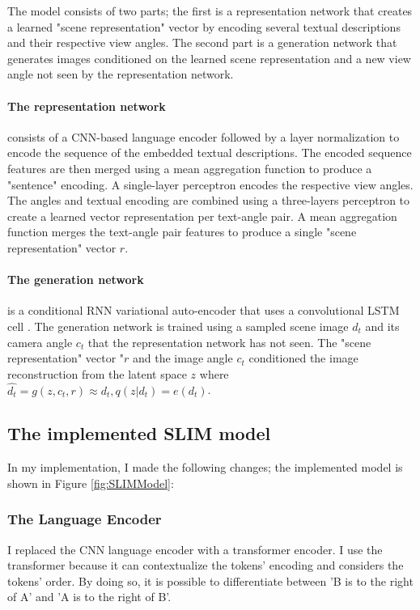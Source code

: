 \documentclass[11pt,a4paper]{article}
\begin{document}
The model consists of two parts; the first is a representation network that creates a learned "scene representation" vector by encoding several textual descriptions and their respective view angles. The second part is  a generation network that generates images conditioned on the learned scene representation and a new view angle not seen by the representation network.

\paragraph{The representation network} consists of a CNN-based language encoder followed by a layer normalization to encode the sequence of the embedded textual descriptions. The encoded sequence features are then merged using a mean aggregation function to produce a "sentence" encoding. A single-layer perceptron encodes the respective view angles. The angles and textual encoding are combined using a three-layers perceptron to create a learned vector representation per text-angle pair. A mean aggregation function merges the text-angle pair features to produce a single "scene representation" vector $r$.

\paragraph{The generation network} is a conditional RNN variational auto-encoder that uses a convolutional LSTM cell \cite{2016arXiv160408772G}. The generation network is trained using a sampled scene image $d_t$ and its camera angle $c_t$ that the representation network has not seen. The "scene representation" vector "$r$ and the image angle $c_t$ conditioned the image reconstruction from the latent space $z$ where $\hat{d_t} = g(z, c_t, r) \approx d_t, q(z|d_t) = e(d_t)$.

\subsection{The implemented SLIM model}

In my implementation, I made the following changes; the implemented model is shown in Figure \ref{fig:SLIMModel}: 

\subsubsection{The Language Encoder}

I replaced the CNN language encoder with a transformer encoder. I use the transformer because it can contextualize the tokens' encoding and considers the tokens' order. By doing so, it is possible to differentiate between  'B is to the right of A' and 'A is to the right of B'.
\end{document}
